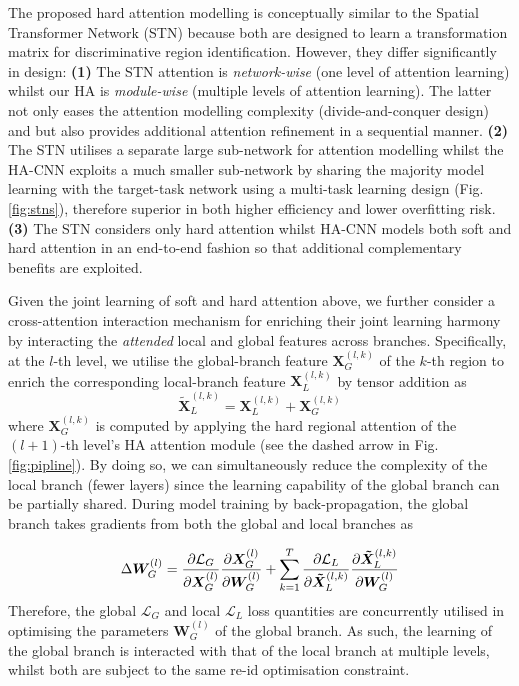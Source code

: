 \documentclass[10pt,twocolumn,letterpaper]{article}
\begin{document}
\vspace{0.01cm}
The proposed hard attention modelling is conceptually similar to
the Spatial Transformer Network (STN) \cite{jaderberg2015spatial}
because both are designed to learn a transformation matrix for discriminative region identification.
However, they differ significantly in design:
{\bf (1)} The STN attention is {\em network-wise} (one level of attention learning)
whilst our HA is {\em module-wise} (multiple levels of attention learning).
The latter not only eases the attention modelling complexity (divide-and-conquer design) and 
but also provides additional attention refinement in a sequential manner.
{\bf (2)} The STN utilises a separate large sub-network 
for attention modelling
whilst the HA-CNN exploits a much smaller sub-network 
by sharing the majority model learning with the target-task network
using a multi-task learning design (Fig. \ref{fig:stns}),
therefore superior in both higher efficiency and lower overfitting risk. 
{\bf (3)} The STN considers only hard attention 
whilst HA-CNN models both soft and hard attention in an end-to-end fashion
so that additional complementary benefits are exploited.

\vspace{0.01cm}
Given the joint learning of soft and hard attention above, 
we further consider a cross-attention interaction mechanism
for enriching their joint learning harmony
by interacting the {\em attended} local and global features across branches.
Specifically, 
at the $l$-th level, 
we utilise the global-branch feature 
$\bm{X}^{(l, k)}_{G}$
of the $k$-th region to
enrich the corresponding 
local-branch feature
$\bm{X}^{(l, k)}_{L}$
by tensor addition as
\begin{equation}
\bm{\tilde{X}}^{(l, k)}_{L}  = \bm{X}^{(l, k)}_{L} + \bm{X}^{(l, k)}_{G}
\end{equation}
where $\bm{X}^{(l, k)}_{G}$ is computed by
applying the hard regional attention of the $(l\!+\!1)$-th level's HA attention module
(see the dashed arrow in Fig. \ref{fig:pipline}).
By doing so, we can simultaneously reduce the complexity of the local branch (fewer layers)
since the learning capability of the global branch can be partially shared.
During model training by back-propagation, 
the global branch takes gradients from both the global and local branches as

\begin{equation}\small
\Delta  \bm{W}^{(l)}_{G} = \frac{\partial \mathcal{L}_{G}}{ \partial \bm{X}^{(l)}_{G}} \frac{\partial \bm{X}^{(l)}_{G}}{ \partial \bm{W}^{(l)}_{G}} +  \sum_{k=1}^{T}  \frac{\partial \mathcal{L}_{L}}{ \partial \bm{\tilde{X}}^{(l, k)}_{L}}  \frac{\partial \bm{\tilde{X}}^{(l, k)}_{L}}{\partial \bm{W}^{(l)}_{G}} 
\end{equation}
Therefore, the global $\mathcal{L}_{G}$ and local $\mathcal{L}_{L}$ loss 
quantities are concurrently utilised in optimising the parameters $\bm{W}^{(l)}_{G}$
of the global branch.
As such, the learning of the global branch is interacted with that of
the local branch at multiple levels, whilst both are subject to the same re-id optimisation constraint.
\end{document}
